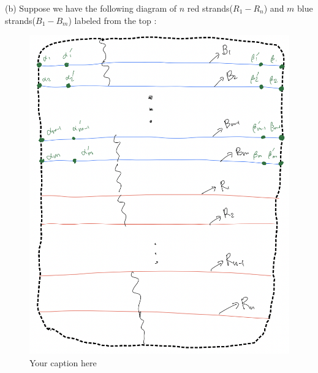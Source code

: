 (b) Suppose we have the following diagram of $n$ red strands($R_1 - R_n$) and $m$ blue strands($B_1 - B_m$) labeled from the top :
\begin{figure}[H] %
    \centering
    \includegraphics[width=\linewidth]{diagrams/definition7/5.png} %
    \caption{Your caption here}
    \label{fig:your-label}
\end{figure}

